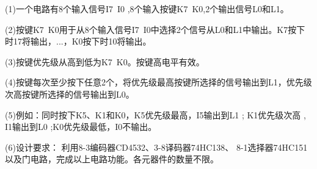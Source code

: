 \documentclass[a4paper,11pt,UTF8]{article}
\begin{document}
(1)一个电路有8个输入信号I7~I0 ,8个输入按键K7~K0,2个输出信号L0和L1。

(2)按键K7~K0用于从8个输入信号I7~I0中选择2个信号从L0和L1中输出。K7按下时17将输出，...，K0按下时10将输出。

(3)按键优先级从高到低为K7~K0。按键高电平有效。

(4)按键每次至少按下任意2个，将优先级最高按键所选择的信号输出到L1，优先级次高按键所选择的信号输出到L0。

(5)例如：同时按下K5、K1和K0，K5优先级最高，I5输出到L1 ; K1优先级次高 , I1输出到L0 ;K0优先级最低，I0不输出。

(6)设计要求： 利用8-3编码器CD4532、3-8译码器74HC138、 8-1选择器74HC151以及门电路，完成以上电路功能。各元器件的数量不限。
\end{document}
